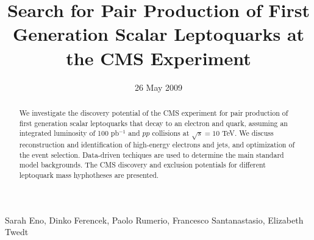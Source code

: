 
%
\begin{titlepage}

   \date{26 May 2009}


  \title{Search for Pair Production of First Generation Scalar Leptoquarks at the CMS Experiment}

  \begin{Authlist}
   Sarah Eno, Dinko Ferencek, Paolo Rumerio, Francesco Santanastasio, Elizabeth Twedt
  \end{Authlist}


  \begin{abstract}
    We investigate the discovery potential of the CMS experiment
    for pair production of first generation scalar leptoquarks that 
    decay to an electron and quark, assuming 
    an integrated luminosity of 100 pb$^{-1}$ and $pp$ collisions 
    at $\sqrt{s}=10$ TeV.
    We discuss 
    reconstruction and identification of high-energy electrons and jets, 
    and optimization of the event selection.
    Data-driven techiques are used to determine 
the main standard model backgrounds. 
The CMS discovery and exclusion potentials for different leptoquark 
mass hyphotheses are presented.



%
  \end{abstract} 

\end{titlepage}

